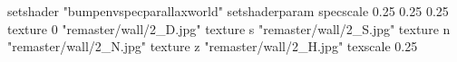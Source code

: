 setshader "bumpenvspecparallaxworld"
setshaderparam specscale 0.25 0.25 0.25
    texture 0 "remaster/wall/2_D.jpg"
    texture s "remaster/wall/2_S.jpg"
    texture n "remaster/wall/2_N.jpg"
    texture z "remaster/wall/2_H.jpg"
    texscale 0.25